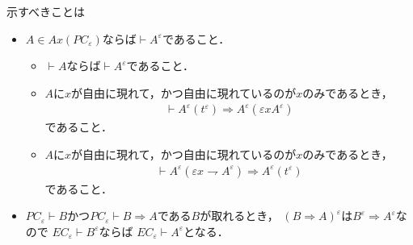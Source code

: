 	示すべきことは
	\begin{itemize}
		\item $A \in Ax(PC_{\varepsilon})$ならば$\vdash A^{\varepsilon}$であること．
			\begin{itemize}
				\item $\vdash A$ならば$\vdash A^{\varepsilon}$であること．
				\item $A$に$x$が自由に現れて，かつ自由に現れているのが$x$のみであるとき，
					\begin{align}
						\vdash A^{\varepsilon}(t^{\varepsilon}) \Longrightarrow A^{\varepsilon}(\varepsilon x A^{\varepsilon})
					\end{align}
					であること．
				\item $A$に$x$が自由に現れて，かつ自由に現れているのが$x$のみであるとき，
					\begin{align}
						\vdash A^{\varepsilon}(\varepsilon x \rightharpoondown A^{\varepsilon}) \Longrightarrow A^{\varepsilon}(t^{\varepsilon})
					\end{align}
					であること．
			\end{itemize}
		
		\item $PC_{\varepsilon} \vdash B$かつ$PC_{\varepsilon} \vdash B \Longrightarrow A$である$B$が取れるとき，
			$(B \Longrightarrow A)^{\varepsilon}$は$B^{\varepsilon} \Longrightarrow A^{\varepsilon}$なので
			$EC_{\varepsilon} \vdash B^{\varepsilon}$ならば
			$EC_{\varepsilon} \vdash A^{\varepsilon}$となる．
	\end{itemize}

